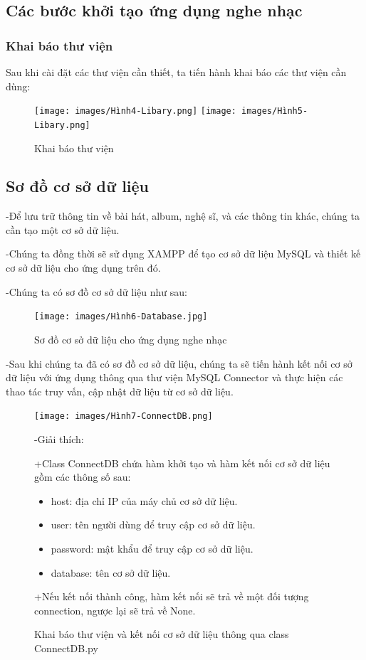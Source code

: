 \documentclass[a4paper]{article}
\begin{document}
\subsection{Các bước khởi tạo ứng dụng nghe nhạc}
\subsubsection{Khai báo thư viện}
\begin{flushleft}
	Sau khi cài đặt các thư viện cần thiết, ta tiến hành khai báo các thư viện cần dùng:
	\begin{figure}[h]
		\centering
		\texttt{[image: images/Hình4-Libary.png]}
		\texttt{[image: images/Hình5-Libary.png]}
		\caption{Khai báo thư viện}
	\end{figure}
\end{flushleft}
\newpage
\subsection{Sơ đồ cơ sở dữ liệu}
\begin{flushleft}
	-Để lưu trữ thông tin về bài hát, album, nghệ sĩ, và các thông tin khác, chúng ta cần tạo một cơ sở dữ liệu.

	-Chúng ta đồng thời sẽ sử dụng XAMPP để tạo cơ sở dữ liệu MySQL và thiết kế cơ sở dữ liệu cho ứng dụng trên đó.

	-Chúng ta có sơ đồ cơ sở dữ liệu như sau:
	\begin{figure}[h]
		\begin{center}
			\texttt{[image: images/Hình6-Database.jpg]}
			\caption{Sơ đồ cơ sở dữ liệu cho ứng dụng nghe nhạc}
		\end{center}
	\end{figure}

	-Sau khi chúng ta đã có sơ đồ cơ sở dữ liệu, chúng ta sẽ tiến hành kết nối cơ sở dữ liệu với ứng dụng thông qua thư viện MySQL Connector
	và thực hiện các thao tác truy vấn, cập nhật dữ liệu từ cơ sở dữ liệu.

	\begin{figure}
		\centering
		\texttt{[image: images/Hình7-ConnectDB.png]}
		\caption{Khai báo thư viện và kết nối cơ sở dữ liệu thông qua class ConnectDB.py}
		\begin{flushleft}
			-Giải thích:

			+Class ConnectDB chứa hàm khởi tạo và hàm kết nối cơ sở dữ liệu gồm các thông số sau:
			\begin{itemize}
				\item host: địa chỉ IP của máy chủ cơ sở dữ liệu.
				\item user: tên người dùng để truy cập cơ sở dữ liệu.
				\item password: mật khẩu để truy cập cơ sở dữ liệu.
				\item database: tên cơ sở dữ liệu.
			\end{itemize}

			+Nếu kết nối thành công, hàm kết nối sẽ trả về một đối tượng connection, ngược lại sẽ trả về None.
		\end{flushleft}
	\end{figure}

\end{flushleft}
\clearpage
\newpage
\end{document}
